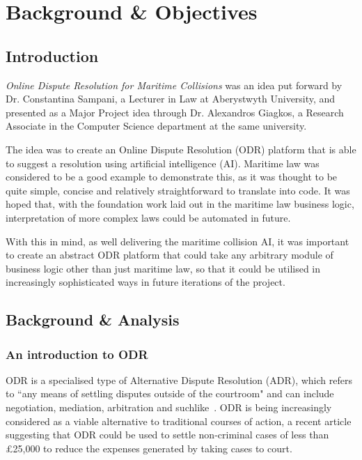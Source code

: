 \chapter{Background \& Objectives}

\section{Introduction}

\emph{Online Dispute Resolution for Maritime Collisions} was an idea put forward by Dr. Constantina Sampani, a Lecturer in Law at Aberystwyth University, and presented as a Major Project idea through Dr. Alexandros Giagkos, a Research Associate in the Computer Science department at the same university.

The idea was to create an Online Dispute Resolution (ODR) platform that is able to suggest a resolution using artificial intelligence (AI). Maritime law was considered to be a good example to demonstrate this, as it was thought to be quite simple, concise and relatively straightforward to translate into code. It was hoped that, with the foundation work laid out in the maritime law business logic, interpretation of more complex laws could be automated in future.

With this in mind, as well delivering the maritime collision AI, it was important to create an abstract ODR platform that could take any arbitrary module of business logic other than just maritime law, so that it could be utilised in increasingly sophisticated ways in future iterations of the project.

\section{Background \& Analysis}

\subsection{An introduction to ODR}

ODR is a specialised type of Alternative Dispute Resolution (ADR), which refers to ``any means of settling disputes outside of the courtroom" and can include negotiation, mediation, arbitration and suchlike~\cite{define:ADR}. ODR is being increasingly considered as a viable alternative  to traditional courses of action, a recent article suggesting that ODR could be used to settle non-criminal cases of less than \pounds25,000 to reduce the expenses generated by taking cases to court.~\cite{report:odrPopular}

